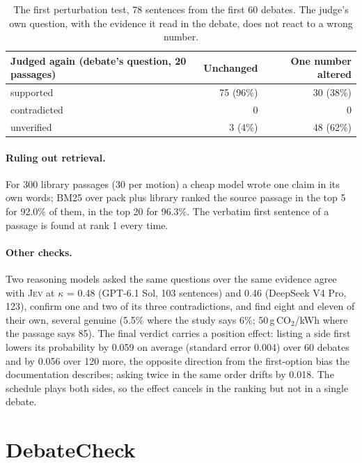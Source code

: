 \documentclass[11pt,a4paper]{article}
\newcommand{\jev}{\textsc{Jev}}
\begin{document}
\begin{table}[t]
\centering\small
\begin{tabular}{@{}lrr@{}}
\toprule
Judged again (debate's question, 20 passages) & Unchanged & One number altered \\
\midrule
supported & 75 (96\%) & 30 (38\%) \\
contradicted & 0 & 0 \\
unverified & 3 (4\%) & 48 (62\%) \\
\bottomrule
\end{tabular}
\caption{The first perturbation test, 78 sentences from the first 60 debates. The judge's own question, with the evidence it read in the debate, does not react to a wrong number.}
\label{tab:perturb}
\end{table}

\paragraph{Ruling out retrieval.} For 300 library passages (30 per motion) a cheap model wrote one claim in its own words; BM25 over pack plus library ranked the source passage in the top 5 for 92.0\% of them, in the top 20 for 96.3\%. The verbatim first sentence of a passage is found at rank 1 every time.

\paragraph{Other checks.} Two reasoning models asked the same questions over the same evidence agree with \jev{} at $\kappa$ = 0.48 (GPT-6.1 Sol, 103 sentences) and 0.46 (DeepSeek V4 Pro, 123), confirm one and two of its three contradictions, and find eight and eleven of their own, several genuine (5.5\% where the study says 6\%; 50\,g\,CO$_2$/kWh where the passage says 85). The final verdict carries a position effect: listing a side first lowers its probability by 0.059 on average (standard error 0.004) over 60 debates and by 0.056 over 120 more, the opposite direction from the first-option bias the documentation describes; asking twice in the same order drifts by 0.018. The schedule plays both sides, so the effect cancels in the ranking but not in a single debate.

\section{DebateCheck}
\label{sec:dataset}
\end{document}

